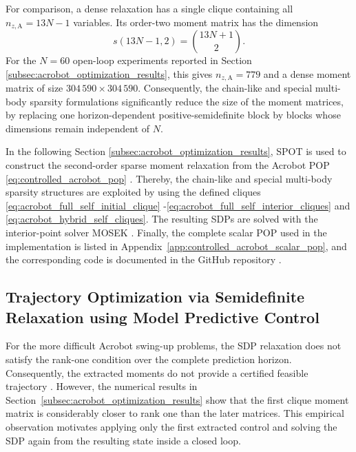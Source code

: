 For comparison, a dense relaxation has a single clique containing all
$n_{z,\mathrm{A}}=13N-1$ variables. Its order-two moment matrix has the dimension
\begin{equation}
s(13N-1,2)=\binom{13N+1}{2}.
\label{eq:acrobot_dense_moment_size}
\end{equation}
For the $N=60$ open-loop experiments reported in Section \ref{subsec:acrobot_optimization_results},
this gives
$n_{z,\mathrm{A}}=779$ and a dense moment matrix of size
$304\,590\times304\,590$. Consequently, the chain-like and special multi-body
sparsity formulations significantly reduce the size of the moment matrices, 
by replacing one horizon-dependent positive-semidefinite block by blocks
whose dimensions remain independent of $N$.

In the following Section \ref{subsec:acrobot_optimization_results},
SPOT is used to construct the second-order sparse moment relaxation 
from the Acrobot POP \eqref{eq:controlled_acrobot_pop} \cite{Kang_2025Global}. 
Thereby, the chain-like and special multi-body sparsity structures are exploited
by using the defined cliques \eqref{eq:acrobot_full_self_initial_clique}
-\eqref{eq:acrobot_full_self_interior_cliques} and \eqref{eq:acrobot_hybrid_self_cliques}.
The resulting SDPs are solved with the interior-point solver MOSEK \cite{MOSEK}.
Finally, the complete scalar POP used in the implementation is listed
in Appendix~\ref{app:controlled_acrobot_scalar_pop}, and the corresponding code
is documented in the GitHub repository
\cite{Elshani2026CTO_GitHub}.

\subsection{Trajectory Optimization via Semidefinite Relaxation using Model Predictive Control}
\label{sec:acrobot_trajectory_optimization_SDP_MPC}

For the more difficult Acrobot swing-up problems, the SDP relaxation does
not satisfy the rank-one condition over the complete prediction horizon.
Consequently, the extracted moments do not provide a certified feasible
trajectory \cite{Sangli2025}. However, the numerical results in
Section~\ref{subsec:acrobot_optimization_results} show that the first clique
moment matrix is considerably closer to rank one than the later matrices.
This empirical observation motivates applying only the first extracted
control and solving the SDP again from the resulting state inside a closed loop.

